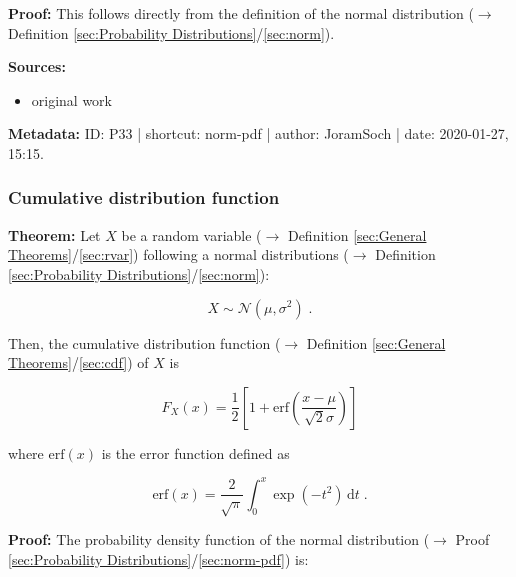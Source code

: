 \documentclass[a4paper,12pt,twoside]{book}
\begin{document}
\vspace{1em}
\textbf{Proof:} This follows directly from the definition of the normal distribution ($\rightarrow$ Definition \ref{sec:Probability Distributions}/\ref{sec:norm}).


\vspace{1em}
\textbf{Sources:}
\begin{itemize}
\item original work\end{itemize}


\vspace{1em}
\textbf{Metadata:} ID: P33 | shortcut: norm-pdf | author: JoramSoch | date: 2020-01-27, 15:15.
\vspace{1em}



\subsubsection[\textbf{Cumulative distribution function}]{Cumulative distribution function} \label{sec:norm-cdf}
\setcounter{equation}{0}

\textbf{Theorem:} Let $X$ be a random variable ($\rightarrow$ Definition \ref{sec:General Theorems}/\ref{sec:rvar}) following a normal distributions ($\rightarrow$ Definition \ref{sec:Probability Distributions}/\ref{sec:norm}):

\begin{equation} \label{eq:norm-cdf-norm}
X \sim \mathcal{N}(\mu, \sigma^2) \; .
\end{equation}

Then, the cumulative distribution function ($\rightarrow$ Definition \ref{sec:General Theorems}/\ref{sec:cdf}) of $X$ is

\begin{equation} \label{eq:norm-cdf-norm-cdf}
F_X(x) = \frac{1}{2} \left[ 1 + \mathrm{erf}\left( \frac{x-\mu}{\sqrt{2} \sigma} \right) \right]
\end{equation}

where $\mathrm{erf}(x)$ is the error function defined as

\begin{equation} \label{eq:norm-cdf-erf}
\mathrm{erf}(x) = \frac{2}{\sqrt{\pi}} \int_{0}^{x} \exp(-t^2) \, \mathrm{d}t \; .
\end{equation}


\vspace{1em}
\textbf{Proof:} The probability density function of the normal distribution ($\rightarrow$ Proof \ref{sec:Probability Distributions}/\ref{sec:norm-pdf}) is:
\end{document}
